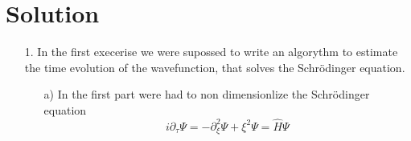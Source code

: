 
\section{Solution}
\label{sec:auswertung}

\begin{itemize}
    \item[1.]
    In the first execerise we were supossed to write an algorythm to estimate the time evolution of the wavefunction, that solves the Schrödinger equation.
    \begin{itemize}
        \item[a)]
        In the first part were had to non dimensionlize the Schrödinger equation
        \begin{equation}
            i \partial_\tau \Psi = -\partial_\xi ^2 \Psi + \xi ^2 \Psi = \hat{H} \Psi
        \end{equation}
        \FloatBarrier



\end{itemize}
\end{itemize}
